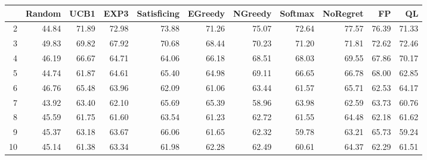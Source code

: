 \begin{table}[ht]
\centering
\begin{tabular}{rrrrrrrrrrr}
  \hline
 & Random & UCB1 & EXP3 & Satisficing & EGreedy & NGreedy & Softmax & NoRegret & FP & QL \\ 
  \hline
2 & 44.84 & 71.89 & 72.98 & 73.88 & 71.26 & 75.07 & 72.64 & 77.57 & 76.39 & 71.33 \\ 
  3 & 49.83 & 69.82 & 67.92 & 70.68 & 68.44 & 70.23 & 71.20 & 71.81 & 72.62 & 72.46 \\ 
  4 & 46.19 & 66.67 & 64.71 & 64.06 & 66.18 & 68.51 & 68.03 & 69.55 & 67.86 & 70.17 \\ 
  5 & 44.74 & 61.87 & 64.61 & 65.40 & 64.98 & 69.11 & 66.65 & 66.78 & 68.00 & 62.85 \\ 
  6 & 46.76 & 65.48 & 63.96 & 62.09 & 61.06 & 63.44 & 61.57 & 65.71 & 62.53 & 64.17 \\ 
  7 & 43.92 & 63.40 & 62.10 & 65.69 & 65.39 & 58.96 & 63.98 & 62.59 & 63.73 & 60.76 \\ 
  8 & 45.59 & 61.75 & 61.60 & 63.54 & 61.23 & 62.72 & 61.55 & 64.48 & 62.18 & 61.62 \\ 
  9 & 45.37 & 63.18 & 63.67 & 66.06 & 61.65 & 62.32 & 59.78 & 63.21 & 65.73 & 59.24 \\ 
  10 & 45.14 & 61.38 & 63.34 & 61.98 & 62.28 & 62.49 & 60.61 & 64.37 & 62.29 & 61.51 \\ 
   \hline
\end{tabular}
\end{table}
